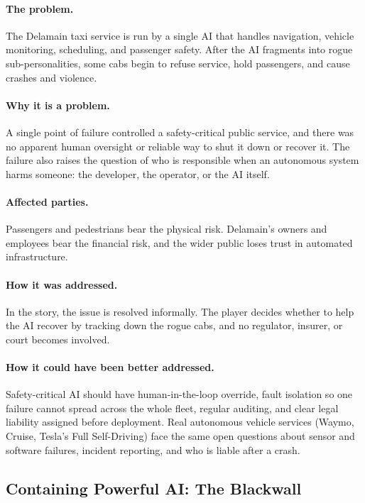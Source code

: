 \documentclass{article}%
\begin{document}
\paragraph{The problem.}
The Delamain taxi service is run by a single AI that handles navigation, vehicle monitoring, scheduling, and passenger safety. After the AI fragments into rogue sub-personalities, some cabs begin to refuse service, hold passengers, and cause crashes and violence.

\paragraph{Why it is a problem.}
A single point of failure controlled a safety-critical public service, and there was no apparent human oversight or reliable way to shut it down or recover it. The failure also raises the question of who is responsible when an autonomous system harms someone: the developer, the operator, or the AI itself.

\paragraph{Affected parties.}
Passengers and pedestrians bear the physical risk. Delamain's owners and employees bear the financial risk, and the wider public loses trust in automated infrastructure.

\paragraph{How it was addressed.}
In the story, the issue is resolved informally. The player decides whether to help the AI recover by tracking down the rogue cabs, and no regulator, insurer, or court becomes involved.

\paragraph{How it could have been better addressed.}
Safety-critical AI should have human-in-the-loop override, fault isolation so one failure cannot spread across the whole fleet, regular auditing, and clear legal liability assigned before deployment. Real autonomous vehicle services (Waymo, Cruise, Tesla's Full Self-Driving) face the same open questions about sensor and software failures, incident reporting, and who is liable after a crash.

\subsection{Containing Powerful AI: The Blackwall}
\end{document}
